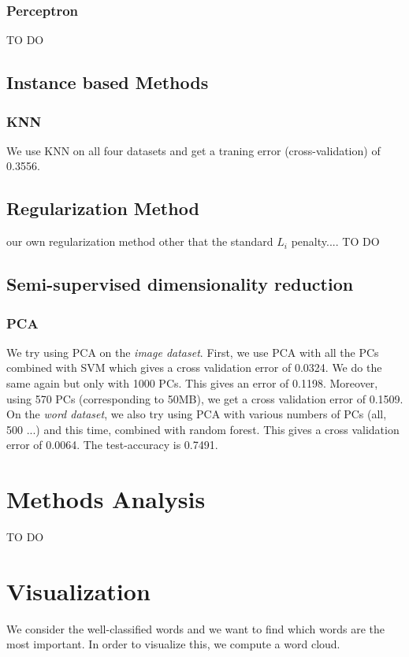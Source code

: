 \documentclass[11pt,twocolumn]{report}
\begin{document}
    \subsubsection*{Perceptron}
    TO DO
    \subsection*{Instance based Methods}
    \subsubsection{KNN}
    
    We use KNN on all four datasets and get a traning error (cross-validation) of 0.3556.
   
    \subsection*{Regularization Method}
    our own regularization method other that the standard $L_i$ penalty....
    TO DO
    \subsection*{Semi-supervised dimensionality reduction}
    \subsubsection*{PCA}
    We try using PCA on the \textit{image dataset}. First, we use PCA with all the PCs combined with SVM which gives a cross validation error of 0.0324. We do the same again but only with 1000 PCs. This gives an error of 0.1198. Moreover, using 570 PCs (corresponding to 50MB), we get a cross validation error of 0.1509.\\
    
    
   On the \textit{word dataset}, we also try using PCA with various numbers of PCs (all, 500 ...) and this time, combined with random forest. This gives a cross validation error of 0.0064. The test-accuracy is 0.7491.\\
    
    

\section *{Methods Analysis}
TO DO
\section*{Visualization}
    We consider the well-classified words and we want to find which words are the most important. In order to visualize this, we compute a word cloud. 
    
\end{document}
